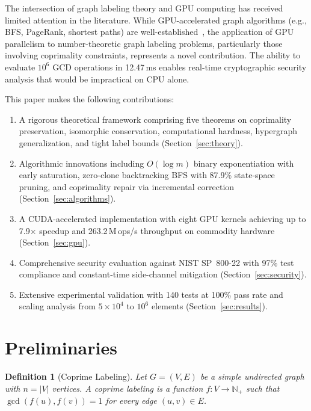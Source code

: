 \documentclass[lettersize,journal]{IEEEtran}
\newtheorem{definition}{Definition}
\begin{document}
The intersection of graph labeling theory and GPU computing has received limited attention in the literature. While GPU-accelerated graph algorithms (e.g., BFS, PageRank, shortest paths) are well-established~\cite{bernstein2014}, the application of GPU parallelism to number-theoretic graph labeling problems, particularly those involving coprimality constraints, represents a novel contribution. The ability to evaluate $10^6$ GCD operations in 12.47\,ms enables real-time cryptographic security analysis that would be impractical on CPU alone.

This paper makes the following contributions:
\begin{enumerate}
\item A rigorous theoretical framework comprising five theorems on coprimality preservation, isomorphic conservation, computational hardness, hypergraph generalization, and tight label bounds (Section~\ref{sec:theory}).
\item Algorithmic innovations including $O(\log m)$ binary exponentiation with early saturation, zero-clone backtracking BFS with 87.9\% state-space pruning, and coprimality repair via incremental correction (Section~\ref{sec:algorithms}).
\item A CUDA-accelerated implementation with eight GPU kernels achieving up to 7.9$\times$ speedup and 263.2\,M\,ops/s throughput on commodity hardware (Section~\ref{sec:gpu}).
\item Comprehensive security evaluation against NIST SP~800-22 with 97\% test compliance and constant-time side-channel mitigation (Section~\ref{sec:security}).
\item Extensive experimental validation with 140 tests at 100\% pass rate and scaling analysis from $5 \times 10^4$ to $10^6$ elements (Section~\ref{sec:results}).
\end{enumerate}

\section{Preliminaries}
\label{sec:prelim}

\begin{definition}[Coprime Labeling]
Let $G = (V, E)$ be a simple undirected graph with $n = |V|$ vertices. A \emph{coprime labeling} is a function $f: V \to \mathbb{N}_+$ such that $\gcd(f(u), f(v)) = 1$ for every edge $(u,v) \in E$.
\end{definition}
\end{document}
